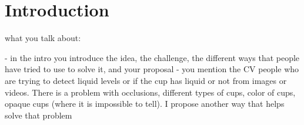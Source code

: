 \section{Introduction}

what you talk about:

- in the intro you introduce the idea, the challenge, the different ways that people have tried to use to solve it, and your proposal
- you mention the CV people who are trying to detect liquid levels or if the cup has liquid or not from images or videos. There is a problem with occlusions, different types of cups, color of cups, opaque cups (where it is impossible to tell). I propose another way that helps solve that problem
